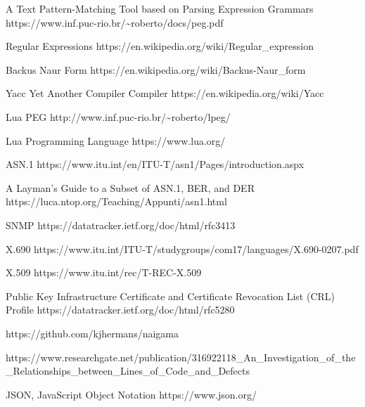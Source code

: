 \begin{thebibliography}{12}

  A Text Pattern-Matching Tool based on Parsing Expression Grammars
  https://www.inf.puc-rio.br/\~{}roberto/docs/peg.pdf

  Regular Expressions
  https://en.wikipedia.org/wiki/Regular\_expression

  Backus Naur Form
  https://en.wikipedia.org/wiki/Backus-Naur\_form

  Yacc Yet Another Compiler Compiler
  https://en.wikipedia.org/wiki/Yacc

  Lua PEG
  http://www.inf.puc-rio.br/\textasciitilde roberto/lpeg/

  Lua Programming Language
  https://www.lua.org/

  ASN.1
  https://www.itu.int/en/ITU-T/asn1/Pages/introduction.aspx

  A Layman's Guide to a Subset of ASN.1, BER, and DER
  https://luca.ntop.org/Teaching/Appunti/asn1.html

  SNMP
  https://datatracker.ietf.org/doc/html/rfc3413

  X.690
  https://www.itu.int/ITU-T/studygroups/com17/languages/X.690-0207.pdf

  X.509
  https://www.itu.int/rec/T-REC-X.509

  Public Key Infrastructure Certificate
             and Certificate Revocation List (CRL) Profile
  https://datatracker.ietf.org/doc/html/rfc5280

  https://github.com/kjhermans/naigama

  https://www.researchgate.net/publication/316922118\_An\_Investigation\_of\_the\_Relationships\_between\_Lines\_of\_Code\_and\_Defects

  JSON, JavaScript Object Notation
  https://www.json.org/

\end{thebibliography}
